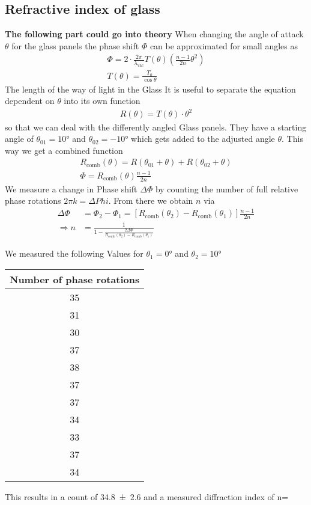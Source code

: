 \subsection{Refractive index of glass}
\textbf{The following part could go into theory}
When changing the angle of attack $\theta$ for the glass panels the phase shift $\Phi$ can be approximated for small angles
as
\begin{align}
	\Phi = 2 \cdot \frac{2\pi}{\lambda_\text{vac}} T(\theta)\left(\frac{n-1}{2n} \theta^2 \right)\\
	T(\theta) = \frac{T_0}{\cos\theta}
\end{align}
The length of the way of light in the Glass
It is useful to separate the equation dependent on $\theta$ into its own function
\begin{align}
	R(\theta)= T(\theta)\cdot \theta^2
\end{align}
so that we can deal with the differently angled Glass panels. 
They have a starting angle of $\theta_{01} = 10°$ and $\theta_{02}= -10°$ 
which gets added to the adjusted angle $\theta$.
This way we get a combined function
\begin{align}
	R_\text{comb} (\theta) = R(\theta_{01}+\theta) + R(\theta_{02}+\theta)\\
	\Phi = R_\text{comb}(\theta) \frac{n-1}{2n}
\end{align}
We measure a change in Phase shift $\Delta \Phi$ by counting the number 
of full relative phase rotations $2 \pi k = \Delta Phi$.
From there we obtain $n$ via
\begin{align} 
	\Delta \Phi &= \Phi_2 -\Phi_1 %
	= \left[ R_\text{comb}(\theta_{2})-R_\text{comb}(\theta_{1}) \right] \frac{n-1}{2n}\\
	\Rightarrow n &= \frac{1}{1-\frac{2\Delta \Phi}{R_\text{comb}(\theta_{2})-R_\text{comb}(\theta_{1})} }
\end{align}


We measured the following Values for $\theta_1 = 0°$ and $\theta_2 = 10°$
\begin{table}
	\centering
	\begin{tabular}{c}
		\toprule
		Number of phase rotations\\
		\midrule
		35 \\ 
		31 \\ 
		30 \\ 
		37 \\ 
		38 \\ 
		37 \\ 
		37 \\ 
		34 \\ 
		33 \\ 
		37 \\ 
		34 \\ 	
		\bottomrule	
	\end{tabular}
\end{table}

This results in a count of \num{34.8(26)} and a measured diffraction index
of n= 